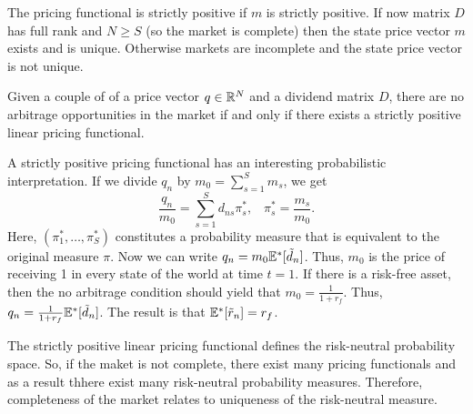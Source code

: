 \documentclass[twoside, titlepage]{article}
\begin{document}
The pricing functional is strictly positive if $m$ is strictly positive. If now matrix $D$ has full rank and $N \geq S$ (so the market is complete) then the state price vector $m$ exists and is unique. Otherwise markets are incomplete and the state price vector is not unique.
\begin{proposition}
    Given a couple of of a price vector $q \in \mathbb{R}^N$ and a dividend matrix $D$, there are no arbitrage opportunities in the market if and only if there exists a strictly positive linear pricing functional.
\end{proposition}
A strictly positive pricing functional has an interesting probabilistic interpretation. If we divide $q_n$ by $m_0 = \sum_{s=1}^{S}m_s$, we get
\[
    \frac{q_n}{m_0} = \sum_{s=1}^{S} d_{ns}\pi^*_s, \;\;\; \pi^*_s = \frac{m_s}{m_0}.
\]
Here, $(\pi_1^*, \dots, \pi_S^*)$ constitutes a probability measure that is equivalent to the original measure $\pi$. Now we can write $q_n = m_0 \mathbb{E}^*[\tilde{d}_n]$. Thus, $m_0$ is the price of receiving 1 in every state of the world at time $t=1$. If there is a risk-free asset, then the no arbitrage condition should yield that $m_0 = \frac{1}{1+r_f}$. Thus, $q_n = \frac{1}{1 + r_f} \mathbb{E}^*[\tilde{d}_n]$. The result is that $\mathbb{E}^*[\tilde{r}_n] = r_f$.

The strictly positive linear pricing functional defines the risk-neutral probability space. So, if the maket is not complete, there exist many pricing functionals and as a result thhere exist many risk-neutral probability measures. Therefore, completeness of the market relates to uniqueness of the risk-neutral measure.
\end{document}
